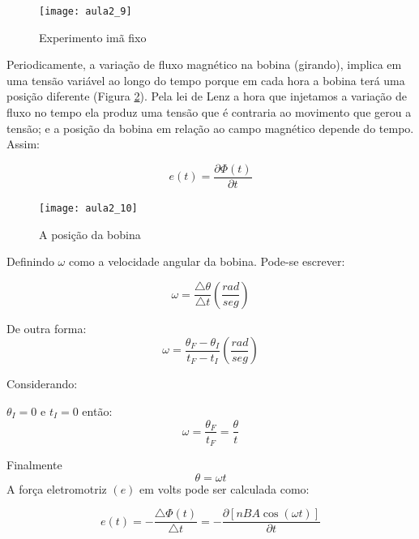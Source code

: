 \begin{figure}[H]
\begin{centering}
\texttt{[image: aula2\_9]}\protect\caption{\label{fig:aula2_9}Experimento imã fixo }
\end{centering}

\end{figure}

Periodicamente, a variação de fluxo magnético na bobina (girando),
implica em uma tensão variável ao longo do tempo porque em cada hora
a bobina terá uma posição diferente (Figura \ref{fig:aula2_10}). Pela lei de Lenz a hora que injetamos
a variação de fluxo no tempo ela produz uma tensão que é contraria
ao movimento que gerou a tensão; e a posição da bobina em relação ao
campo magnético depende do tempo. Assim:

\begin{equation}\label{eq:et}
e(t)=\frac{\partial\Phi(t)}{\partial t}
\end{equation}

\begin{figure}[H]
\begin{centering}
\texttt{[image: aula2\_10]}\protect\caption{\label{fig:aula2_10}A posição da bobina }
\end{centering}

\end{figure}
Definindo $\omega$ como a velocidade angular da bobina. Pode-se escrever:

\begin{equation}\label{eq:omega}
\omega=\frac{\triangle\theta}{\triangle t}(\frac{rad}{seg})
\end{equation}

De outra forma:
\begin{equation}\label{eq:omega2}
\omega=\frac{\theta_{F}-\theta_{I}}{t_{F}-t_{I}}(\frac{rad}{seg})
\end{equation}

Considerando:

$\theta_{I}=0$ e $t_{I}=0$ então:
\begin{equation}\label{eq:omega3}
\omega=\frac{\theta_{F}}{t_{F}}=\frac{\theta}{t}
\end{equation}

Finalmente
\begin{equation}\label{eq:omega4}
\theta=\omega t
\end{equation}
A força eletromotriz $(e)$ em volts pode ser calculada como:

\begin{equation}\label{eq:ele}
e(t)=-\frac{\triangle\Phi(t)}{\triangle t}=-\frac{\partial[nBA\cos(\omega t)]}{\partial t}
\end{equation}

